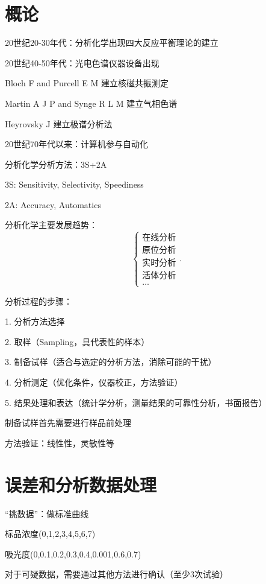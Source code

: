 \section{概论}%
\label{sec:概论}
20世纪20-30年代：分析化学出现四大反应平衡理论的建立

20世纪40-50年代：光电色谱仪器设备出现
\begin{notation}
    Bloch F and Purcell E M 建立核磁共振测定

    Martin A J P and Synge R L M 建立气相色谱

    Heyrovsky J 建立极谱分析法
\end{notation}
20世纪70年代以来：计算机参与自动化
\begin{notation}
    分析化学分析方法：3S+2A

    3S: Sensitivity, Selectivity, Speediness
    
    2A: Accuracy, Automatics
\end{notation}
分析化学主要发展趋势：
\[
    \begin{cases}
        \mbox{在线分析}\\ 
        \mbox{原位分析}\\ 
        \mbox{实时分析}\\ 
        \mbox{活体分析}\\ 
        \ldots
    \end{cases}
.\] 
\begin{notation}
    分析过程的步骤：

    1. 分析方法选择

    2. 取样（Sampling，具代表性的样本）

    3. 制备试样（适合与选定的分析方法，消除可能的干扰）

    4. 分析测定（优化条件，仪器校正，方法验证）

    5. 结果处理和表达（统计学分析，测量结果的可靠性分析，书面报告）
\end{notation}
\begin{notation}
    制备试样首先需要进行样品前处理

    方法验证：线性性，灵敏性等
\end{notation}
\section{误差和分析数据处理}%
\label{sec:误差和分析数据处理}
\begin{notation}
    “挑数据”：做标准曲线

    标品浓度(0,1,2,3,4,5,6,7)

    吸光度(0,0.1,0.2,0.3,0.4,0.001,0.6,0.7)

    对于可疑数据，需要通过其他方法进行确认（至少3次试验）
\end{notation}
